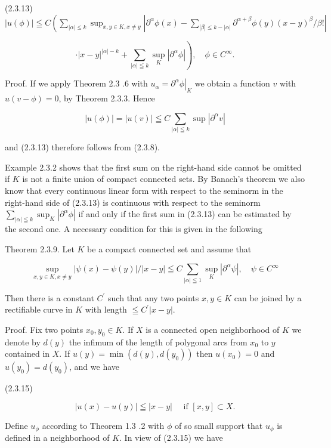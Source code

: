 (2.3.13) $|u(\phi)| \leqq C\left(\sum_{|\alpha| \leq k} \sup _{x, y \in K, x \neq y}\left|\partial^{\alpha} \phi(x)-\sum_{|\beta| \leq k-|\alpha|} \partial^{\alpha+\beta} \phi(y)(x-y)^{\beta} / \beta !\right|\right.$

\[
\left.\cdot|x-y|^{|\alpha|-k}+\sum_{|\alpha| \leqq k} \sup _{K}\left|\partial^{\alpha} \phi\right|\right), \quad \phi \in C^{\infty} .
\]

Proof. If we apply Theorem 2.3 .6 with $u_{\alpha}=\left.\partial^{\alpha} \phi\right|_{K}$ we obtain a function $v$ with $u(v-\phi)=0$, by Theorem 2.3.3. Hence

\[
|u(\phi)|=|u(v)| \leqq C \sum_{|\alpha| \leqq k} \sup \left|\partial^{\alpha} v\right|
\]

and (2.3.13) therefore follows from (2.3.8).

Example 2.3.2 shows that the first sum on the right-hand side cannot be omitted if $K$ is not a finite union of compact connected sets. By Banach's theorem we also know that every continuous linear form with respect to the seminorm in the right-hand side of (2.3.13) is continuous with respect to the seminorm $\sum_{|\alpha| \leqq k} \sup _{K}\left|\partial^{\alpha} \phi\right|$ if and only if the first sum in (2.3.13) can be estimated by the second one. A necessary condition for this is given in the following

Theorem 2.3.9. Let $K$ be a compact connected set and assume that


\begin{equation*}
\sup _{x, y \in K, x \neq y}|\psi(x)-\psi(y)| /|x-y| \leqq C \sum_{|\alpha| \leqq 1} \sup _{K}\left|\partial^{\alpha} \psi\right|, \quad \psi \in C^{\infty} \tag{2.3.14}
\end{equation*}


Then there is a constant $C^{\prime}$ such that any two points $x, y \in K$ can be joined by a rectifiable curve in $K$ with length $\leqq C^{\prime}|x-y|$.

Proof. Fix two points $x_{0}, y_{0} \in K$. If $X$ is a connected open neighborhood of $K$ we denote by $d(y)$ the infimum of the length of polygonal arcs from $x_{0}$ to $y$ contained in $X$. If $u(y)=\min \left(d(y), d\left(y_{0}\right)\right)$ then $u\left(x_{0}\right)=0$ and $u\left(y_{0}\right)=d\left(y_{0}\right)$, and we have

(2.3.15)

\[
|u(x)-u(y)| \leqq|x-y| \quad \text { if }[x, y] \subset X .
\]

Define $u_{\phi}$ according to Theorem 1.3 .2 with $\phi$ of so small support that $u_{\phi}$ is defined in a neighborhood of $K$. In view of (2.3.15) we have

